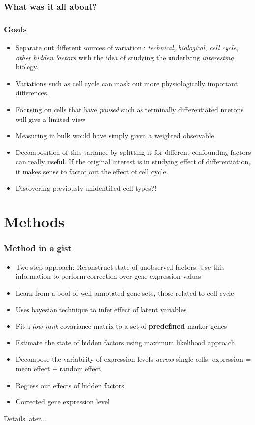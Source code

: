 \documentclass[10pt, compress]{beamer}
\renewcommand{\(}{\begin{columns}}
\renewcommand{\)}{\end{columns}}
\newcommand{\<}[1]{\begin{column}{#1}}
\renewcommand{\>}{\end{column}}
\begin{document}
\begin{frame}[fragile]
\frametitle{What was it all about?}
\frametitle{Goals}
\begin{itemize}[<+- | alert@+>]
\item Separate out different sources of variation : \textit{technical}, \textit{biological}, \textit{cell cycle}, \textit{other hidden factors}
with the idea of studying the underlying \textit{interesting} biology. \\

\item Variations such as cell cycle can mask out more physiologically important differences.\\

\item Focusing on cells that have \textit{paused} such as terminally differentiated nuerons will give a limited view

\item Measuring in bulk would have simply given a weighted observable

\item Decomposition of this variance by splitting it for different confounding factors can really useful.
If the original interest is in studying effect of differentiation, it makes sense to factor out the
effect of cell cycle. \\


\item Discovering previously unidentified cell types?! \\
\end{itemize}
\end{frame}


\section{Methods}
\begin{frame}[fragile]
\frametitle{Method in a gist}
\begin{itemize}[<+- | alert@+>]
\item Two step approach: Reconstruct state of unobserved factors; Use this information to perform correction over gene 
expression values
\item Learn from a pool of well annotated gene sets, those related to cell cycle
\item Uses bayesian technique to infer effect of latent variables
\item Fit a \textit{low-rank} covariance matrix to a set of \textbf{predefined} marker genes
\item Estimate the state of hidden factors using maximum likelihood approach
\item Decompose the variability of expression levels \textit{across} single cells: expression = mean effect + random effect
\item Regress out effects of hidden factors
\item Corrected gene expression level

\end{itemize}
Details later...
\end{frame}
\end{document}
